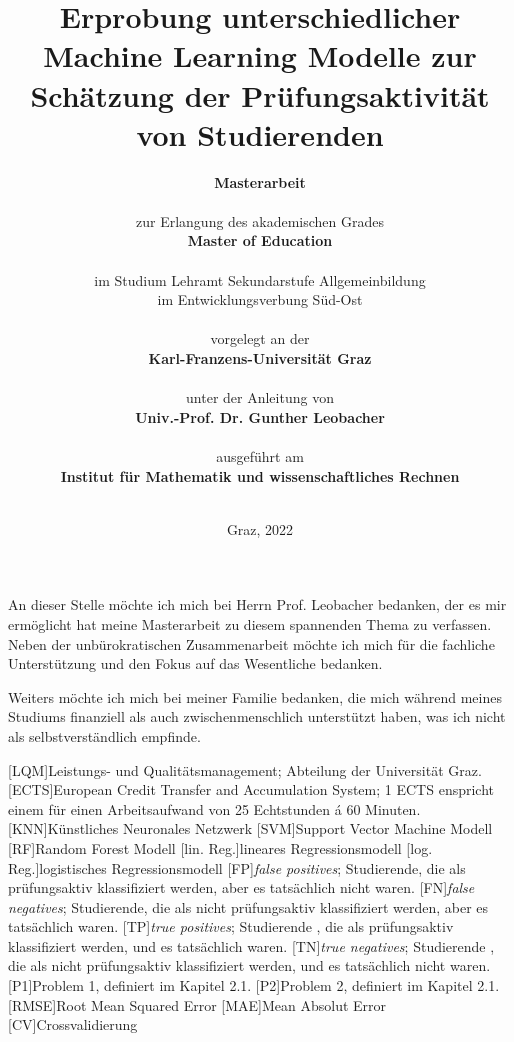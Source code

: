 \documentclass[
    fontsize=12pt,
    paper=A4,
    parskip=full, %
    bibliography=totoc,
    abstract=on,
    listof=totoc,
]{scrreprt} %
\title{
        {Erprobung unterschiedlicher Machine Learning Modelle zur Sch\"atzung der Pr\"ufungsaktivit\"at von Studierenden}
        }
\author{
        
        \Huge{\textbf{Masterarbeit}} \\
        \ \\
        \large{zur Erlangung des akademischen Grades} \\
        \large{\textbf{Master of Education}}\\ 
        \\
        \large{im Studium Lehramt Sekundarstufe Allgemeinbildung}\\
        \large{im Entwicklungsverbung Süd-Ost}\\
        \ \\
        \large{vorgelegt an der} \\
        \large{\textbf{Karl-Franzens-Universität Graz}}\\
        \\
        \large{unter der Anleitung von} \\
        \large{\textbf{Univ.-Prof. Dr. Gunther Leobacher}} \\
        \\
        \large{ausgef\"uhrt am}\\
        \large{\textbf{Institut f\"ur Mathematik und wissenschaftliches Rechnen}}
        \\
        \\
        }
\date{ \normalsize{Graz, 2022}}
\begin{document}
\begin{singlespace}
    \maketitle
    \setcounter{page}{2}
\end{singlespace}




An dieser Stelle m\"ochte ich mich bei Herrn Prof. Leobacher bedanken, der es mir erm\"oglicht hat meine Masterarbeit zu
diesem spannenden Thema zu verfassen. Neben der unb\"urokratischen Zusammenarbeit m\"ochte ich mich f\"ur die fachliche
Unterst\"utzung und den Fokus auf das Wesentliche bedanken.

Weiters m\"ochte ich mich bei meiner Familie bedanken, die mich w\"ahrend meines Studiums finanziell als auch zwischenmenschlich unterst\"utzt haben, 
was ich nicht als selbstverst\"andlich empfinde.




\tableofcontents %


\begin{acronym}
    [LQM]{Leistungs- und Qualit\"atsmanagement; Abteilung der Universität Graz.}
    [ECTS]{European Credit Transfer and Accumulation System; 1 ECTS enspricht einem f\"ur einen Arbeitsaufwand von 25 Echtstunden \'a 60 Minuten.}
    [KNN]{K\"unstliches Neuronales Netzwerk}
    [SVM]{Support Vector Machine Modell}
    [RF]{Random Forest Modell}
    [lin. Reg.]{lineares Regressionsmodell}
    [log. Reg.]{logistisches Regressionsmodell}
    [FP]{\textit{false positives}; Studierende, die als pr\"ufungsaktiv klassifiziert werden, aber es tats\"achlich nicht waren.}
    [FN]{\textit{false negatives}; Studierende, die als nicht pr\"ufungsaktiv klassifiziert werden, aber es tats\"achlich waren.}
    [TP]{\textit{true positives}; Studierende , die als pr\"ufungsaktiv klassifiziert werden, und es tats\"achlich waren.}
    [TN]{\textit{true negatives}; Studierende , die als nicht pr\"ufungsaktiv klassifiziert werden, und es tats\"achlich nicht waren.}
    [P1]{Problem 1, definiert im Kapitel 2.1.}
    [P2]{Problem 2, definiert im Kapitel 2.1.}
    [RMSE]{Root Mean Squared Error}
    [MAE]{Mean Absolut Error}
    [CV]{Crossvalidierung}

\end{acronym}
\end{document}

